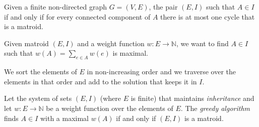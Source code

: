 \documentclass[00_complete]{subfiles}
\begin{document}
Given a finite non-directed graph $ G=(V,E) $, the pair $ (E,I) $ such that
$ A \in I $ if and only if for every connected component of $ A $ there is at
most one cycle that is a matroid.

Given matroid $ (E,I) $ and a weight function $ w: E \to \mathbb{N} $, we want
to find $ A \in I $ such that $ w(A) = \sum_{e \in A}w(e) $ is maximal.

\begin{definition}
    We sort the elements of $ E $ in non-increasing order and we traverse over
    the elements in that order and add to the solution that keeps it in $ I $.
\end{definition}

\begin{theorem}
    Let the system of sets $ (E,I) $ (where $ E $ is finite) that maintains
    \textit{inheritance} and let $ w: E \to \mathbb{N}$ be a weight function
    over the elements of $ E $. The \textit{greedy algorithm} finds $ A \in I $
    with a maximal $ w(A) $ if and only if $ (E, I) $ is a matroid.
\end{theorem}
\end{document}
